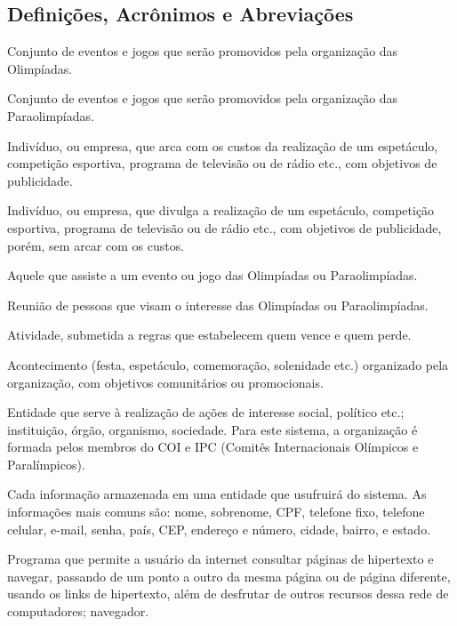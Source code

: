 \documentclass[
10pt, %
a4paper, %
oneside, %
headinclude,footinclude, %
BCOR5mm, %
]{scrartcl}
\begin{document}
\subsection{Definições, Acrônimos e Abreviações}
\begin{description}[noitemsep] %
	\item[Olimpíadas] Conjunto de eventos e jogos que serão promovidos pela organização das Olimpíadas.
	\item[Paraolimpíadas] Conjunto de eventos e jogos que serão promovidos pela organização das Paraolimpíadas.
	\item[Patrocinador] Indivíduo, ou empresa, que arca com os custos da realização de um espetáculo, competição esportiva, programa de televisão ou de rádio etc., com objetivos de publicidade.
	\item[Apoiador] Indivíduo, ou empresa, que divulga a realização de um espetáculo, competição esportiva, programa de televisão ou de rádio etc., com objetivos de publicidade, porém, sem arcar com os custos.
	\item[Espectador] Aquele que assiste a um evento ou jogo das Olimpíadas ou Paraolimpíadas.
	\item[Comitê] Reunião de pessoas que visam o interesse das Olimpíadas ou Paraolimpíadas.
	\item[Jogo] Atividade, submetida a regras que estabelecem quem vence e quem perde.
	\item[Evento] Acontecimento (festa, espetáculo, comemoração, solenidade etc.) organizado pela organização, com objetivos comunitários ou promocionais.
	\item[Organização] Entidade que serve à realização de ações de interesse social, político etc.; instituição, órgão, organismo, sociedade. Para este sistema, a organização é formada pelos membros do COI e IPC (Comitês Internacionais Olímpicos e Paralímpicos).
	\item[Item de Informação] Cada informação armazenada em uma entidade que usufruirá do sistema. As informações mais comuns são: nome, sobrenome, CPF, telefone fixo, telefone celular, e-mail, senha, país, CEP, endereço e número, cidade, bairro, e estado.
	\item[Browser] Programa que permite a usuário da internet consultar páginas de hipertexto e navegar, passando de um ponto a outro da mesma página ou de página diferente, usando os links de hipertexto, além de desfrutar de outros recursos dessa rede de computadores; navegador.
\end{description}
 
\end{document}
